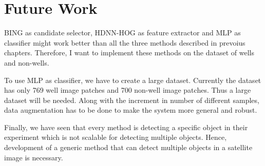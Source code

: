 \section{Future Work}
BING as candidate selector, HDNN-HOG as feature extractor and MLP as classifier might work better than all the three methods described in prevoius chapters. Therefore, I want to implement these methods on the dataset of wells and non-wells. 
\par To use MLP as classifier, we have to create a large dataset. Currently the dataset has only 769 well image patches and 700 non-well image patches. Thus a large dataset will be needed. Along with the increment in number of different samples, data augmentation has to be done to make the system more general and robust.
\par Finally, we have seen that every method is detecting a specific object in their experiment which is not scalable for detecting multiple objects. Hence, development of a generic method that can detect multiple objects in a satellite image is necessary. 


